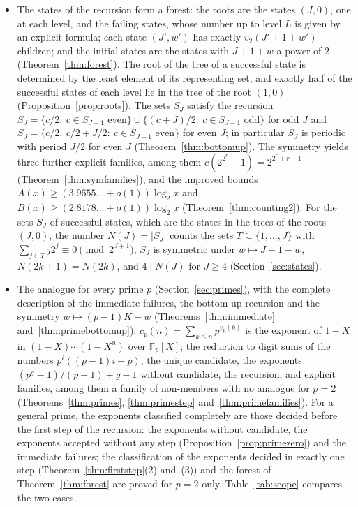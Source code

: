\documentclass[11pt]{amsart}
\theoremstyle{definition}
\begin{document}
\begin{itemize}
\item The states of the recursion form a forest: the roots are the states $(J,0)$, one at each level, and the failing states, whose number up to level $L$ is given by an explicit formula; each state $(J',w')$ has exactly $v_2(J'+1+w')$ children; and the initial states are the states with $J+1+w$ a power of $2$ (Theorem~\ref{thm:forest}). The root of the tree of a successful state is determined by the least element of its representing set, and exactly half of the successful states of each level lie in the tree of the root $(1,0)$ (Proposition~\ref{prop:roots}). The sets $S_J$ satisfy the recursion $S_J=\{c/2:\ c\in S_{J-1}\text{ even}\}\cup\{(c+J)/2:\ c\in S_{J-1}\text{ odd}\}$ for odd $J$ and $S_J=\{c/2,\ c/2+J/2:\ c\in S_{J-1}\text{ even}\}$ for even $J$; in particular $S_J$ is periodic with period $J/2$ for even $J$ (Theorem~\ref{thm:bottomup}). The symmetry yields three further explicit families, among them $c(2^{2^r}-1)=2^{2^r+r-1}$ (Theorem~\ref{thm:symfamilies}), and the improved bounds $A(x)\ge(3.9655\ldots+o(1))\log_2x$ and $B(x)\ge(2.8178\ldots+o(1))\log_2x$ (Theorem~\ref{thm:counting2}). For the sets $S_J$ of successful states, which are the states in the trees of the roots $(J,0)$, the number $N(J)=|S_J|$ counts the sets $T\subseteq\{1,\dots,J\}$ with $\sum_{j\in T}j2^j\equiv0\pmod{2^{J+1}}$, $S_J$ is symmetric under $w\mapsto J-1-w$, $N(2k+1)=N(2k)$, and $4\mid N(J)$ for $J\ge4$ (Section~\ref{sec:states}).
\item The analogue for every prime $p$ (Section~\ref{sec:primes}), with the complete description of the immediate failures, the bottom-up recursion and the symmetry $w\mapsto(p-1)K-w$ (Theorems~\ref{thm:immediate} and~\ref{thm:primebottomup}): $c_p(n)=\sum_{k\le n}p^{v_p(k)}$ is the exponent of $1-X$ in $(1-X)\cdots(1-X^n)$ over $\mathbb{F}_p[X]$; the reduction to digit sums of the numbers $p^i((p-1)i+p)$, the unique candidate, the exponents $(p^g-1)/(p-1)+g-1$ without candidate, the recursion, and explicit families, among them a family of non-members with no analogue for $p=2$ (Theorems~\ref{thm:primes}, \ref{thm:primestep} and~\ref{thm:primefamilies}). For a general prime, the exponents classified completely are those decided before the first step of the recursion: the exponents without candidate, the exponents accepted without any step (Proposition~\ref{prop:primezero}) and the immediate failures; the classification of the exponents decided in exactly one step (Theorem~\ref{thm:firststep}(2) and~(3)) and the forest of Theorem~\ref{thm:forest} are proved for $p=2$ only. Table~\ref{tab:scope} compares the two cases.

\end{itemize}
\end{document}

